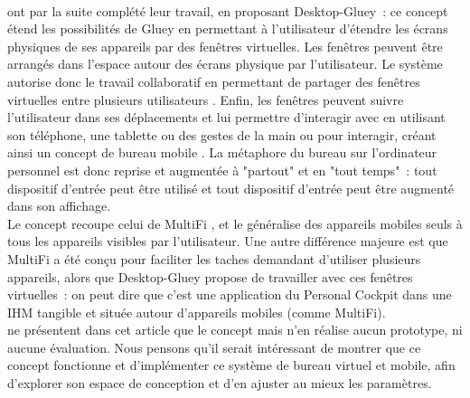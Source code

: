 
\paragraph*{}
\citet{SerranoEnsYangEtAl2015b} ont par la suite complété leur travail, en proposant Desktop-Gluey~: ce concept étend les possibilités de Gluey en permettant à l'utilisateur d'étendre les écrans physiques de ses appareils par des fenêtres virtuelles. Les fenêtres peuvent être arrangés dans l'espace autour des écrans physique par l'utilisateur. Le système autorise donc le travail collaboratif en permettant de partager des fenêtres virtuelles entre plusieurs utilisateurs . Enfin, les fenêtres peuvent suivre l'utilisateur dans ses déplacements et lui permettre d'interagir avec en utilisant son téléphone, une tablette ou des gestes de la main ou pour interagir, créant ainsi un concept de bureau mobile . La métaphore du bureau sur l'ordinateur personnel est donc reprise et augmentée à "partout" et en "tout temps"~: tout dispositif d'entrée peut être utilisé et tout dispositif d'entrée peut être augmenté dans son affichage.\\
Le concept recoupe celui de MultiFi \citep{GrubertHeinischQuigleyEtAl2015}, et le généralise des appareils mobiles seuls à tous les appareils visibles par l'utilisateur. Une autre différence majeure est que MultiFi a été conçu pour faciliter les taches demandant d'utiliser plusieurs appareils, alors que Desktop-Gluey propose de travailler avec ces fenêtres virtuelles~: on peut dire que c'est une application du Personal Cockpit \citep{EnsFinneganIrani2014} dans une IHM tangible et située autour d'appareils mobiles (comme MultiFi).\\
\citeauthor{SerranoEnsYangEtAl2015b} ne présentent dans cet article que le concept mais n'en réalise aucun prototype, ni aucune évaluation. Nous pensons qu'il serait intéressant de montrer que ce concept fonctionne et d'implémenter ce système de bureau virtuel et mobile, afin d'explorer son espace de conception et d'en ajuster au mieux les paramètres.


